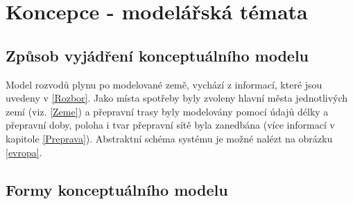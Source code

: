 \documentclass[a4paper,11pt]{article}
\begin{document}
\newpage

\section{Koncepce - modelářská témata}



\subsection{Způsob vyjádření konceptuálního modelu}

Model rozvodů plynu po modelované země, vychází z informací, které jsou uvedeny v \ref{Rozbor}.
Jako místa spotřeby byly zvoleny hlavní města jednotlivých zemí (viz. \ref{Zeme})
a přepravní trasy byly modelovány pomocí údajů délky a přepravní doby, poloha i tvar přepravní sítě byla zanedbána
(více informací v kapitole \ref{Preprava}). 
Abstraktní schéma systému je možné nalézt na obrázku \ref{evropa}.

\subsection{Formy konceptuálního modelu}
\end{document}
